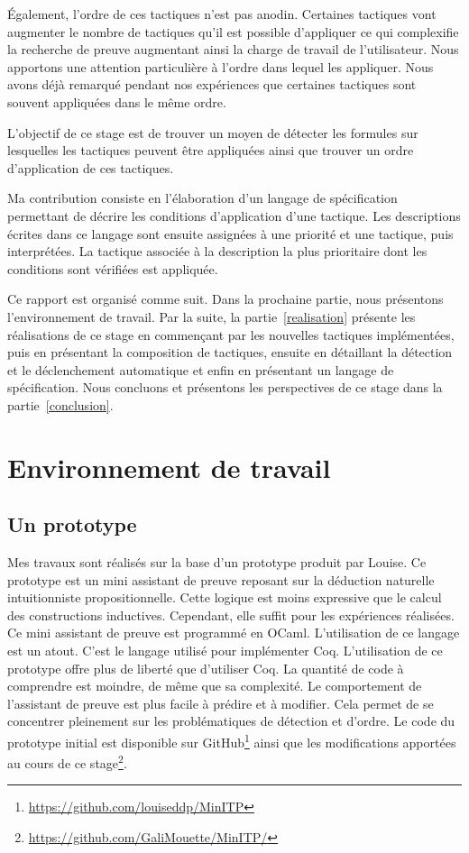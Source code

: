 \documentclass[french,titlepage]{article}
\begin{document}
Également, l'ordre de ces tactiques n'est pas anodin. Certaines tactiques vont augmenter le nombre de tactiques qu'il est possible d'appliquer ce qui complexifie la recherche de preuve augmentant ainsi la charge de travail de l'utilisateur. Nous apportons une attention particulière à l'ordre dans lequel les appliquer. Nous avons déjà remarqué pendant nos expériences que certaines tactiques sont souvent appliquées dans le même ordre.

L'objectif de ce stage est de trouver un moyen de détecter les formules sur lesquelles les tactiques peuvent être appliquées ainsi que trouver un ordre d'application de ces tactiques.

Ma contribution consiste en l'élaboration d'un langage de spécification permettant de décrire les conditions d'application d'une tactique. Les descriptions écrites dans ce langage sont ensuite assignées à une priorité et une tactique, puis interprétées. La tactique associée à la description la plus prioritaire dont les conditions sont vérifiées est appliquée.

Ce rapport est organisé comme suit. Dans la prochaine partie, nous présentons l'environnement de travail. Par la suite, la partie~\ref{realisation} présente les réalisations de ce stage en commençant par les nouvelles tactiques implémentées, puis en présentant la composition de tactiques, ensuite en détaillant la détection et le déclenchement automatique et enfin en présentant un langage de spécification. Nous concluons et présentons les perspectives de ce stage dans la partie~\ref{conclusion}.



\section{Environnement de travail} \label{env_travail}
\subsection{Un prototype} \label{env_travail:proto}
Mes travaux sont réalisés sur la base d'un prototype produit par Louise. Ce prototype est un mini assistant de preuve reposant sur la déduction naturelle intuitionniste propositionnelle. Cette logique est moins expressive que le calcul des constructions inductives. Cependant, elle suffit pour les expériences réalisées. Ce mini assistant de preuve est programmé en OCaml. L'utilisation de ce langage est un atout. C'est le langage utilisé pour implémenter Coq. L'utilisation de ce prototype offre plus de liberté que d'utiliser Coq. La quantité de code à comprendre est moindre, de même que sa complexité. Le comportement de l'assistant de preuve est plus facile à prédire et à modifier. Cela permet de se concentrer pleinement sur les problématiques de détection et d'ordre. Le code du prototype initial est disponible sur GitHub\footnote{\url{https://github.com/louiseddp/MinITP}} ainsi que les modifications apportées au cours de ce stage\footnote{\url{https://github.com/GaliMouette/MinITP/}}.
\end{document}
